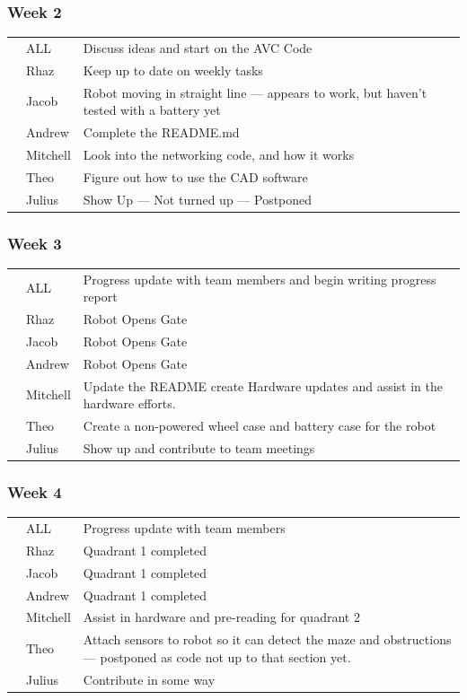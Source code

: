 \documentclass[paper=a4, fontsize=11pt]{scrartcl} %
\def\checkmark{\tikz\fill[scale=0.4] (0,.35) -- (.25,0) -- (1,.7) -- (.25,.15) -- cycle;}
\def\scalecheck{\resizebox{\widthof{\checkmark}*\ratio{\widthof{x}}{\widthof{\normalsize x}}}{!}{\checkmark}}
\numberwithin{equation}{section} %
\numberwithin{figure}{section} %
\begin{document}
\subsubsection*{Week 2}
\begin{tabularx}{\textwidth}{clX}
  \scalecheck  & ALL      & Discuss ideas and start on the AVC Code\\
  \scalecheck  & Rhaz     & Keep up to date on weekly tasks\\
               & Jacob    & Robot moving in straight line --- appears to work, but haven't tested with a battery yet\\
  \scalecheck  & Andrew   & Complete the README.md\\
  \scalecheck  & Mitchell & Look into the networking code, and how it works\\
  \scalecheck  & Theo     & Figure out how to use the CAD software\\
               & Julius   & Show Up --- Not turned up --- Postponed\\
\end{tabularx}
\subsubsection*{Week 3}
\begin{tabularx}{\textwidth}{clX}
  \scalecheck & ALL      & Progress update with team members and begin writing progress report\\
  \scalecheck & Rhaz     & Robot Opens Gate\\
  \scalecheck & Jacob    & Robot Opens Gate\\
  \scalecheck & Andrew   & Robot Opens Gate\\
  \scalecheck & Mitchell & Update the README create Hardware updates and assist in the hardware efforts.\\
  \scalecheck & Theo     & Create a non-powered wheel case and battery case for the robot\\
              & Julius   & Show up and contribute to team meetings\\
\end{tabularx}
\subsubsection*{Week 4}
\begin{tabularx}{\textwidth}{clX}
  \scalecheck & ALL      & Progress update with team members\\
  \scalecheck & Rhaz     & Quadrant 1 completed\\
  \scalecheck & Jacob    & Quadrant 1 completed\\
  \scalecheck & Andrew   & Quadrant 1 completed\\
  \scalecheck & Mitchell & Assist in hardware and pre-reading for quadrant 2\\
              & Theo     & Attach sensors to robot so it can detect the maze and obstructions --- postponed as code not up to that section yet.\\
              & Julius   & Contribute in some way\\
\end{tabularx}
\end{document}
